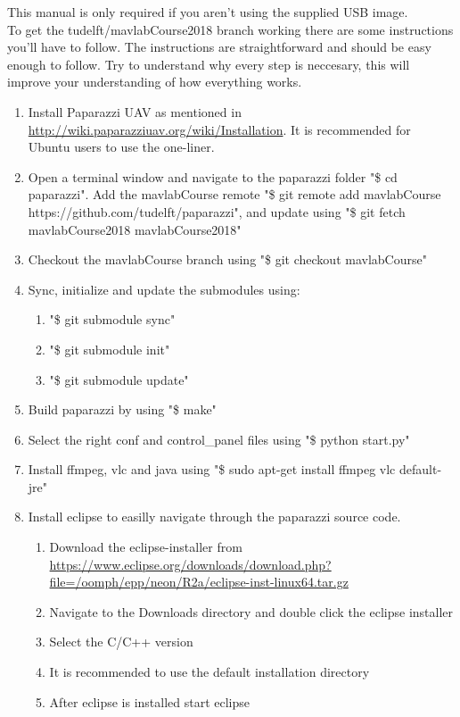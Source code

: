 \documentclass{article}
\begin{document}
This manual is only required if you aren't using the supplied USB image.\\

\noindent To get the tudelft/mavlabCourse2018 branch working there are some instructions you'll have to follow. The instructions are straightforward and should be easy enough to follow. Try to understand why every step is neccesary, this will improve your understanding of how everything works.

\begin{enumerate}
\item{Install Paparazzi UAV as mentioned in \url{http://wiki.paparazziuav.org/wiki/Installation}. It is recommended for Ubuntu users to use the one-liner.}
\item{Open a terminal window and navigate to the paparazzi folder "\$ cd paparazzi". Add the mavlabCourse remote "\$ git remote add mavlabCourse https://github.com/tudelft/paparazzi", and update using "\$ git fetch mavlabCourse2018 mavlabCourse2018"}
\item{Checkout the mavlabCourse branch using "\$ git checkout mavlabCourse"}
\item{Sync, initialize and update the submodules using:
\begin{enumerate}
\item{"\$ git submodule sync"}
\item{"\$ git submodule init"}
\item{"\$ git submodule update"}
\end{enumerate}
}
\item{Build paparazzi by using "\$ make"}
\item{Select the right conf and control\_panel files using "\$ python start.py"}
\item{Install ffmpeg, vlc and java using "\$ sudo apt-get install ffmpeg vlc default-jre"}
\item{Install eclipse to easilly navigate through the paparazzi source code.
\begin{enumerate}
\item{Download the eclipse-installer from \url{https://www.eclipse.org/downloads/download.php?file=/oomph/epp/neon/R2a/eclipse-inst-linux64.tar.gz}}
\item{Navigate to the Downloads directory and double click the eclipse installer}
\item{Select the C/C++ version}
\item{It is recommended to use the default installation directory}
\item{After eclipse is installed start eclipse}

\end{enumerate}}
\end{enumerate}
\end{document}
